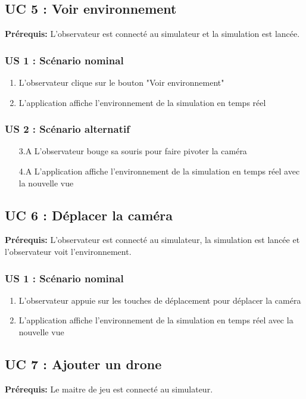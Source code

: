 \documentclass{scrartcl}
\begin{document}
\subsection{UC 5 : Voir environnement}
\textbf{Prérequis:} L'observateur est connecté au simulateur et la simulation est lancée.

\subsubsection*{US 1 : Scénario nominal}
\begin{enumerate}
    \item L'observateur clique sur le bouton "Voir environnement"
    \item L'application affiche l'environnement de la simulation en temps réel
\end{enumerate}

\subsubsection*{US 2 : Scénario alternatif}
\begin{enumerate}
    \item[3.A] L'observateur bouge sa souris pour faire pivoter la caméra
    \item[4.A] L'application affiche l'environnement de la simulation en temps réel avec la nouvelle vue
\end{enumerate}

\subsection{UC 6 : Déplacer la caméra}
\textbf{Prérequis:} L'observateur est connecté au simulateur, la simulation est lancée et l'observateur voit l'environnement.

\subsubsection*{US 1 : Scénario nominal}
\begin{enumerate}
    \item L'observateur appuie sur les touches de déplacement pour déplacer la caméra
    \item L'application affiche l'environnement de la simulation en temps réel avec la nouvelle vue
\end{enumerate}

\subsection{UC 7 : Ajouter un drone}
\textbf{Prérequis:} Le maitre de jeu est connecté au simulateur.
\end{document}
